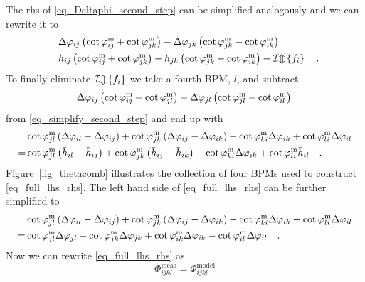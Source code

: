 The rhs of \eqref{eq_Deltaphi_second_step} can be simplified analogously and we can rewrite it to
%
\begin{align}
  & \Delta\varphi_{ij} \left( 
    \cot \varphi_{ij}^\text{m} + \cot\varphi_{jk}^\text{m}
  \right)
  -
  \Delta\varphi_{jk} \left( 
    \cot\varphi_{jk}^\text{m} - \cot\varphi_{ik}^\text{m}
  \right) \notag \\
  =& 
  \bar{h}_{ij} \left( 
    \cot \varphi_{ij}^\text{m} + \cot\varphi_{jk}^\text{m}
  \right)
  -
  \bar{h}_{jk} \left( 
    \cot\varphi_{jk}^\text{m} - \cot\varphi_{ik}^\text{m}
  \right)
  - \mathcal{Im} \left\{ f_i \right\}
  \quad .
  \label{eq_simplify_second_step}
\end{align}
%
To finally eliminate $\mathcal{Im} \left\{ f_i \right\}$ we take a fourth BPM, $l$, and subtract 
%
\begin{equation}
   \Delta\varphi_{ij} \left( 
    \cot \varphi_{ij}^\text{m} + \cot\varphi_{jl}^\text{m}
  \right)
  -
  \Delta\varphi_{jl} \left( 
    \cot\varphi_{jl}^\text{m} - \cot\varphi_{il}^\text{m}
  \right) \notag \\
  \label{eq_fourth_bpm}
\end{equation}
%
from \eqref{eq_simplify_second_step} and end up with
%
\begin{align}
 &\cot\varphi_{jl}^\text{m} \left( \Delta\varphi_{il} - \Delta\varphi_{ij} \right) 
 + \cot\varphi_{jk}^\text{m} \left( \Delta\varphi_{ij} - \Delta\varphi_{ik} \right) 
 - \cot\varphi_{ki}^\text{m} \Delta \varphi_{ik} + \cot\varphi_{li}^\text{m}\Delta\varphi_{il}\notag  \\
 =& 
 \cot\varphi_{jl}^\text{m} \left( \bar{h}_{il} - \bar{h}_{ij} \right) 
 + \cot\varphi_{jk}^\text{m} \left( \bar{h}_{ij} - \bar{h}_{ik} \right)
 - \cot\varphi_{ki}^\text{m} \Delta \varphi_{ik} + \cot\varphi_{li}^\text{m}\bar{h}_{il} 
\quad .
\label{eq_full_lhs_rhs}
\end{align}
%
Figure~\ref{fig_thetacomb} illustrates the collection of four BPMs used to construct
\eqref{eq_full_lhs_rhs}.
The left hand side of \eqref{eq_full_lhs_rhs} can be further simplified to
%
\begin{align}
 &\cot\varphi_{jl}^\text{m} \left( \Delta\varphi_{il} - \Delta\varphi_{ij} \right) 
 + \cot\varphi_{jk}^\text{m} \left( \Delta\varphi_{ij} - \Delta\varphi_{ik} \right) 
 - \cot\varphi_{ki}^\text{m} \Delta \varphi_{ik} + \cot\varphi_{li}^\text{m}\Delta\varphi_{il} \notag\\
 =&\cot\varphi_{jl}^\text{m} \Delta\varphi_{jl} - \cot\varphi_{jk}^\text{m} \Delta\varphi_{jk}
+ \cot\varphi_{ik}^\text{m}\Delta\varphi_{ik} - \cot\varphi_{il}^\text{m}\Delta\varphi_{il}
\quad .
  \end{align}
%
  Now we can rewrite \eqref{eq_full_lhs_rhs} as
%
\begin{equation}
  \Phi_{ijkl}^{\mathrm{meas}} = \Phi_{ijkl}^{\mathrm{model}} 
  \label{eq_Deltaphi_model_meas_app}
\end{equation}
